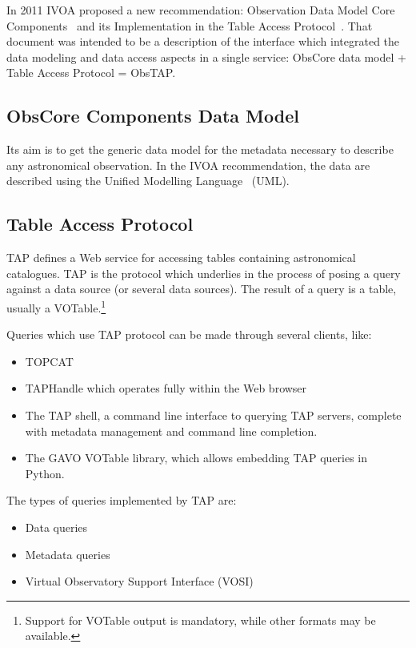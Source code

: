 In 2011 IVOA proposed a new recommendation: Observation Data Model Core
Components~\cite{2011arXiv1111.1758L}
and its Implementation in the Table Access
Protocol~\cite{2010tap..irec.....D}.
That document was intended to be a description of the interface which integrated the data modeling and data access aspects in a single service: ObsCore data model + Table Access Protocol = ObsTAP.

\subsection{ObsCore Components Data Model}

Its aim is to get the generic data model for the metadata necessary to describe any astronomical observation. In the IVOA recommendation, the data are described using
the Unified Modelling Language~\cite{Burkhardt:1997:UML} (UML).

\subsection{Table Access Protocol}

TAP defines a Web service for accessing tables containing astronomical catalogues. TAP is the protocol which underlies in the process of posing a query against a data source (or several data sources). The result of a query is a table, usually a VOTable.\footnote{Support for VOTable output is mandatory, while other formats may be available.}  

Queries which use TAP protocol can be made through several clients, like:
\begin{itemize}
\item TOPCAT
\item TAPHandle which operates fully within the Web browser
\item The TAP shell, a command line interface to querying TAP servers, complete with metadata management and command line completion.
\item The GAVO VOTable library, which allows embedding TAP queries in Python.
\end{itemize}

The types of queries implemented by TAP are:

\begin{itemize}
\item Data queries
\item Metadata queries
\item Virtual Observatory Support Interface (VOSI)
\end{itemize}


